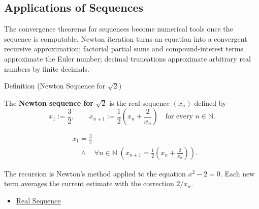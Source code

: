 \subsection*{Applications of Sequences}
\begin{exposition}
The convergence theorems for sequences become numerical tools once the
sequence is computable. Newton iteration turns an equation into a convergent
recursive approximation; factorial partial sums and compound-interest terms
approximate the Euler number; decimal truncations approximate arbitrary real
numbers by finite decimals.
\end{exposition}


\begin{definitionbox}{Definition (Newton Sequence for $\sqrt{2}$)}
\begin{definition}
\label{def:newton-sequence-sqrt-two}
The \textbf{Newton sequence for} $\sqrt{2}$ is the real sequence $(x_n)$
defined by
\[
  x_1:=\frac{3}{2},
  \qquad
  x_{n+1}:=\frac{1}{2}\left(x_n+\frac{2}{x_n}\right)
  \quad\text{for every } n\in\mathbb{N}.
\]
\end{definition}
\end{definitionbox}

\begin{remark*}
\[
\begin{aligned}
&x_1=\frac{3}{2}\\
&\quad\land\quad
\forall n\in\mathbb{N}\;
\left(
  x_{n+1}=\frac{1}{2}\left(x_n+\frac{2}{x_n}\right)
\right).
\end{aligned}
\]
\end{remark*}

\begin{remark*}[Interpretation]
The recursion is Newton's method applied to the equation $x^2-2=0$.
Each new term averages the current estimate with the correction $2/x_n$.
\end{remark*}

\begin{dependencies}
\begin{itemize}
  \item \hyperref[def:real-sequence]{Real Sequence}
\end{itemize}
\end{dependencies}

